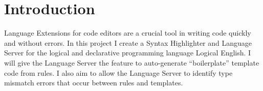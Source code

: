 \documentclass[../main.tex]{subfiles}
\begin{document}
\section*{Introduction}
Language Extensions for code editors are a crucial tool in writing code quickly and without errors. In this project I create a Syntax Highlighter and Language Server for the logical and declarative programming language Logical English. I will give the Language Server the feature to auto-generate ``boilerplate'' template code from rules. I also aim to allow the Language Server to identify type mismatch errors that occur between rules and templates.
\end{document}
